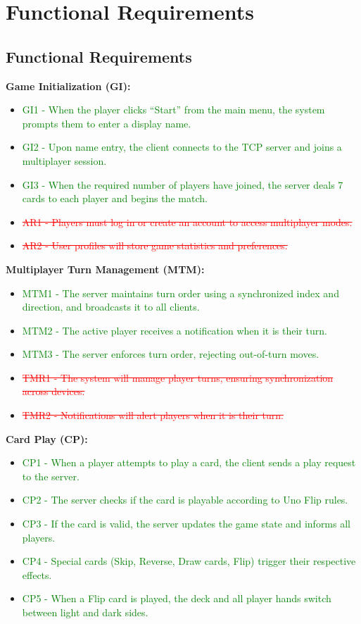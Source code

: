\documentclass[12pt]{article}
\newcommand{\removed}[1]{\textcolor{red}{\sout{#1}}}
\newcommand{\added}[1]{\textcolor{green}{#1}}
\begin{document}
\section{Functional Requirements}

\subsection{Functional Requirements}

\textbf{Game Initialization (GI):}
\begin{itemize}
    \item \added{GI1 - When the player clicks “Start” from the main menu, the system prompts them to enter a display name.}
    \item \added{GI2 - Upon name entry, the client connects to the TCP server and joins a multiplayer session.}
    \item \added{GI3 - When the required number of players have joined, the server deals 7 cards to each player and begins the match.}
    \item \removed{AR1 - Players must log in or create an account to access multiplayer modes.}
    \item \removed{AR2 - User profiles will store game statistics and preferences.}
\end{itemize}

\textbf{Multiplayer Turn Management (MTM):}
\begin{itemize}
    \item \added{MTM1 - The server maintains turn order using a synchronized index and direction, and broadcasts it to all clients.}
    \item \added{MTM2 - The active player receives a notification when it is their turn.}
    \item \added{MTM3 - The server enforces turn order, rejecting out-of-turn moves.}
    \item \removed{TMR1 - The system will manage player turns, ensuring synchronization across devices.}
    \item \removed{TMR2 - Notifications will alert players when it is their turn.}
\end{itemize}

\textbf{Card Play (CP):}
\begin{itemize}
    \item \added{CP1 - When a player attempts to play a card, the client sends a play request to the server.}
    \item \added{CP2 - The server checks if the card is playable according to Uno Flip rules.}
    \item \added{CP3 - If the card is valid, the server updates the game state and informs all players.}
    \item \added{CP4 - Special cards (Skip, Reverse, Draw cards, Flip) trigger their respective effects.}
    \item \added{CP5 - When a Flip card is played, the deck and all player hands switch between light and dark sides.}
\end{itemize}
\end{document}
